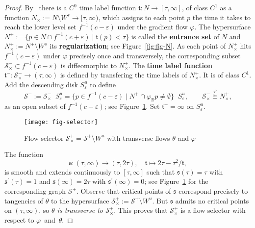 \documentclass{article}
\theoremstyle{definition}
\theoremstyle{remark}
\renewcommand{\1}{{{\mathchoice {\rm 1\mskip-4mu l} {\rm 1\mskip-4mu l}
{\rm 1\mskip-4.5mu l} {\rm 1\mskip-5mu l}}}}
\newcommand{\R}{{\mathbb{R}}}
\newcommand{\Ss}{{\mathcal{S}}}
\newcommand{\eps}{{\varepsilon}}
\begin{document}
\begin{proof}
By~\cite[Thm.~1.2]{Weber:2015c} there is a $C^0$ time label function
$\mathfrak{t}:N\to[\tau,\infty]$, of class $C^1$ as a function
$N_\times:=N\setminus W^s\to[\tau,\infty)$, which assigns to
each point $p$ the time it takes to reach the lower level set
$f^{-1}(c-\eps)$ under the gradient flow $\varphi$. The hypersurface
$N^+:=\{p\in N\cap f^{-1}(c+\eps)\mid\mathfrak{t}(p)<\tau\}$
is called the \textbf{entrance set} of $N$ and
$N^+_\times:=N^+\setminus W^s$ its \textbf{regularization};
see Figure~\ref{fig:fig-N}. As each point of $N^+_\times$ hits
$f^{-1}(c-\eps)$ under $\varphi$ precisely once and transversely, the
corresponding subset $\Ss^-_\times\subset f^{-1}(c-\eps)$ is
diffeomorphic to $N^+_\times$. The \textbf{time label function}
$\mathfrak{t}^-:\Ss^-_\times\to(\tau,\infty)$ is defined by transfering
the time labels of $N^+_\times$. It is of class $C^1$.
Add the descending disk $S^u_\eps$ to define
$$
     \Ss^-:=\Ss^-_\times\mathop{\dot{\cup}} S^u_\eps
     =\{p\in f^{-1}(c-\eps)\mid N^+\cap\varphi_\R p\not=\emptyset\}
     \mathop{\dot{\cup}} S^u_\eps,\qquad
     \Ss^-_\times\stackrel{\varphi}{\cong} N^+_\times,
$$
as an open subset of $f^{-1}(c-\eps)$; see Figure~\ref{fig:fig-selector}.
Set $\mathfrak{t}^-=\infty$ on $S^u_\eps$.
%
\begin{figure}%
  \centering
  \texttt{[image: fig-selector]}
  \caption{Flow selector $\Ss^+_\times=\Ss^+\setminus W^u$
          with transverse flows $\theta$ and $\varphi$
          }
  \label{fig:fig-selector}
\end{figure}
The function
$$
     \mathfrak{s}:(\tau,\infty)\to(\tau,2\tau),\quad
     \mathfrak{t}\mapsto 2\tau-\tau^2/\mathfrak{t},
$$
is smooth and extends continuously to  $[\tau,\infty]$ such that
$\mathfrak{s}(\tau)=\tau$ with $\mathfrak{s}^\prime(\tau)=1$
and $\mathfrak{s}(\infty)=2\tau$ with $\mathfrak{s}^\prime(\infty)=0$;
see Figure~\ref{fig:fig-selector} for the corresponding graph $\Ss^+$.
Observe that critical points of $\mathfrak{s}$
correspond precisely to tangencies of $\theta$ to the hypersurface
$\Ss^+_\times:=\Ss^+\setminus W^u$. But $\mathfrak{s}$ admits
no critical points on $(\tau,\infty)$, so \emph{$\theta$ is transverse to
$\Ss^+_\times$}. This proves that $\Ss^+_\times$ is a flow selector
with respect to $\varphi$~and~$\theta$.


\end{proof}
\end{document}
